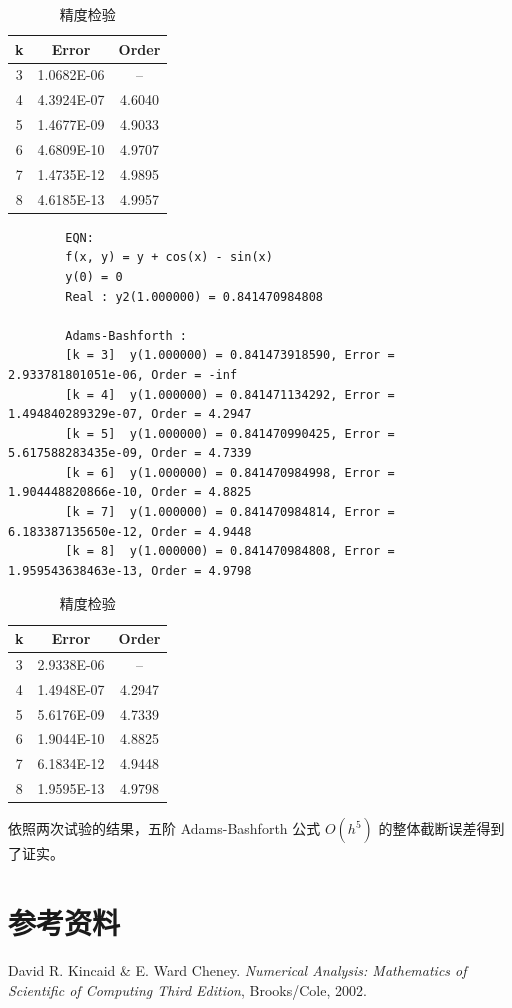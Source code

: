 \documentclass{ctexart}
\begin{document}
	\begin{table}[htb]
		\centering
		\bigskip
		\begin{small}
			\begin{tabular}{|c|cc|}
				\hline
					k & Error & Order\\
				\hline
					3 & 1.0682E-06 & -- \\
					4 & 4.3924E-07 & 4.6040 \\
					5 & 1.4677E-09 & 4.9033 \\
					6 & 4.6809E-10 & 4.9707 \\
					7 & 1.4735E-12 & 4.9895 \\
					8 & 4.6185E-13 & 4.9957 \\
				\hline
			\end{tabular}
		\end{small}
		\caption{\label{table1.label} 精度检验}
	\end{table}

	\begin{verbatim}
		EQN:
		f(x, y) = y + cos(x) - sin(x)
		y(0) = 0
		Real : y2(1.000000) = 0.841470984808
		
		Adams-Bashforth :
		[k = 3]  y(1.000000) = 0.841473918590, Error = 2.933781801051e-06, Order = -inf
		[k = 4]  y(1.000000) = 0.841471134292, Error = 1.494840289329e-07, Order = 4.2947
		[k = 5]  y(1.000000) = 0.841470990425, Error = 5.617588283435e-09, Order = 4.7339
		[k = 6]  y(1.000000) = 0.841470984998, Error = 1.904448820866e-10, Order = 4.8825
		[k = 7]  y(1.000000) = 0.841470984814, Error = 6.183387135650e-12, Order = 4.9448
		[k = 8]  y(1.000000) = 0.841470984808, Error = 1.959543638463e-13, Order = 4.9798
	\end{verbatim}
		
	\begin{table}[htb]
		\centering
		\bigskip
		\begin{small}
			\begin{tabular}{|c|cc|}
				\hline
				k & Error & Order\\
				\hline
				3 & 2.9338E-06 & -- \\
				4 & 1.4948E-07 & 4.2947 \\
				5 & 5.6176E-09 & 4.7339 \\
				6 & 1.9044E-10 & 4.8825 \\
				7 & 6.1834E-12 & 4.9448 \\
				8 & 1.9595E-13 & 4.9798 \\
				\hline
			\end{tabular}
		\end{small}
		\caption{\label{table2.label} 精度检验}
	\end{table}
	
	依照两次试验的结果，五阶 Adams-Bashforth 公式 $O(h^5)$ 的整体截断误差得到了证实。

\section*{参考资料}
	\noindent [1] David R. Kincaid \& E. Ward Cheney. {\it Numerical Analysis: Mathematics of Scientific of Computing Third Edition}, Brooks/Cole, 2002.
\end{document}
